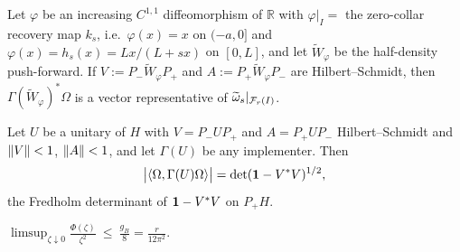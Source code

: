 \begin{lemma}\label{lem:vector}
Let $\varphi$ be an increasing $C^{1,1}$ diffeomorphism of $\mathbb R$ with
$\varphi|_I=$ the zero-collar recovery map $k_s$, i.e.\ $\varphi(x)=x$ on
$(-a,0]$ and $\varphi(x)=h_s(x)=Lx/(L+sx)$ on $[0,L]$, and let
$\widetilde W_\varphi$ be the half-density push-forward.  If
$V:=P_-\widetilde W_\varphi P_+$ and $A:=P_+\widetilde W_\varphi P_-$ are
Hilbert--Schmidt, then $\Gamma(\widetilde W_\varphi)^*\Omega$ is a vector
representative of $\widetilde\omega_s|_{\mathcal F_r(I)}$.
\end{lemma}

\begin{theorem}\label{thm:det}
Let $U$ be a unitary of $H$ with $V=P_-UP_+$ and $A=P_+UP_-$ Hilbert--Schmidt and
$\lVert V\rVert<1$, $\lVert A\rVert<1$, and let $\Gamma(U)$ be any implementer.  Then
\begin{equation}\label{eq:det}
 \bigl|\langle\Omega,\Gamma(U)\Omega\rangle\bigr|=\det(\mathbf 1-V^*V)^{1/2},
\end{equation}
the Fredholm determinant of $\mathbf 1-V^*V$ on $P_+H$.
\end{theorem}

\begin{theorem}\label{thm:upper}
$\displaystyle
 \limsup_{\zeta\downarrow0}\frac{\Phi(\zeta)}{\zeta^2}\ \le\ \frac{g_B}8
 =\frac r{12\pi^2}.$
\end{theorem}

